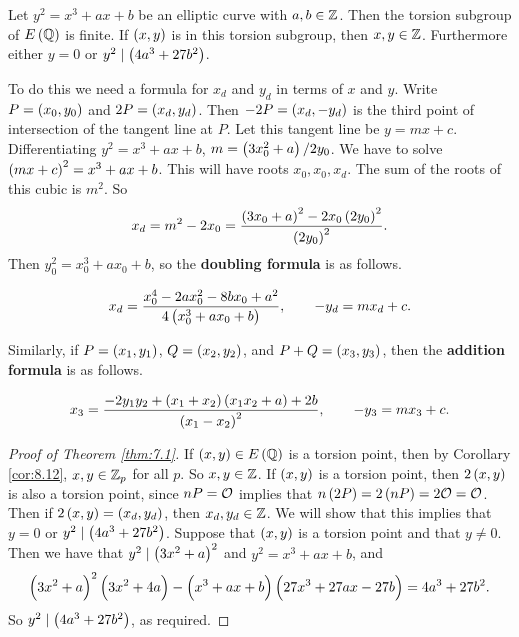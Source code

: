 \begin{theorem}
\label{thm:7.1}
Let $ y^2 = x^3 + ax + b $ be an elliptic curve with $ a, b \in \mathbb{Z} $. Then the torsion subgroup of $ E\br{\QQ} $ is finite. If $ \br{x, y} $ is in this torsion subgroup, then $ x, y \in \mathbb{Z} $. Furthermore either $ y = 0 $ or $ y^2 \mid \br{4a^3 + 27b^2} $.
\end{theorem}

To do this we need a formula for $ x_d $ and $ y_d $ in terms of $ x $ and $ y $. Write $ P = \br{x_0, y_0} $ and $ 2P = \br{x_d, y_d} $. Then $ -2P = \br{x_d, -y_d} $ is the third point of intersection of the tangent line at $ P $. Let this tangent line be $ y = mx + c $. Differentiating $ y^2 = x^3 + ax + b $, $ m = \br{3x_0^2 + a} / 2y_0 $. We have to solve $ \br{mx + c}^2 = x^3 + ax + b $. This will have roots $ x_0, x_0, x_d $. The sum of the roots of this cubic is $ m^2 $. So
$$ x_d = m^2 - 2x_0 = \dfrac{\br{3x_0 + a}^2 - 2x_0\br{2y_0}^2}{\br{2y_0}^2}. $$
Then $ y_0^2 = x_0^3 + ax_0 + b $, so the \textbf{doubling formula} is as follows.

\begin{algorithm}
$$ x_d = \dfrac{x_0^4 - 2ax_0^2 - 8bx_0 + a^2}{4\br{x_0^3 + ax_0 + b}}, \qquad -y_d = mx_d + c. $$
\end{algorithm}

Similarly, if $ P = \br{x_1, y_1} $, $ Q = \br{x_2, y_2} $, and $ P + Q = \br{x_3, y_3} $, then the \textbf{addition formula} is as follows.

\begin{algorithm}
$$ x_3 = \dfrac{-2y_1y_2 + \br{x_1 + x_2}\br{x_1x_2 + a} + 2b}{\br{x_1 - x_2}^2}, \qquad -y_3 = mx_3 + c. $$
\end{algorithm}

\begin{proof}[Proof of Theorem \ref{thm:7.1}]
If $ \br{x, y} \in E\br{\QQ} $ is a torsion point, then by Corollary \ref{cor:8.12}, $ x, y \in \mathbb{Z}_p $ for all $ p $. So $ x, y \in \mathbb{Z} $. If $ \br{x, y} $ is a torsion point, then $ 2\br{x, y} $ is also a torsion point, since $ nP = \mathcal{O} $ implies that $ n\br{2P} = 2\br{nP} = 2\OOO = \OOO $. Then if $ 2\br{x, y} = \br{x_d, y_d} $, then $ x_d, y_d \in \mathbb{Z} $. We will show that this implies that $ y = 0 $ or $ y^2 \mid \br{4a^3 + 27b^2} $. Suppose that $ \br{x, y} $ is a torsion point and that $ y \ne 0 $. Then we have that $ y^2 \mid \br{3x^2 + a}^2 $ and $ y^2 = x^3 + ax + b $, and
$$ \br{3x^2 + a}^2\br{3x^2 + 4a} - \br{x^3 + ax + b}\br{27x^3 + 27ax - 27b} = 4a^3 + 27b^2. $$
So $ y^2 \mid \br{4a^3 + 27b^2} $, as required.
\end{proof}

